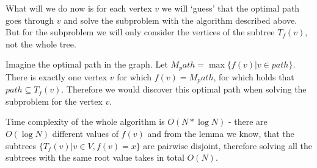 What will we do now is for each vertex $v$ we will `guess' that the optimal path
goes through $v$ and solve the subproblem with the algorithm described above.
But for the subproblem we will only consider the vertices of
the subtree $T_f(v)$, not the whole tree.

Imagine the optimal path in the graph. Let $M_path = \max\{f(v) | v \in path\}$.
There is exactly one vertex $v$ for which $f(v) = M_path$,
for which holds that $path \subseteq T_f(v)$. Therefore we would discover this
optimal path when solving the subproblem for the vertex $v$.

Time complexity of the whole algorithm is $O(N * \log N)$ - there are $O(\log N)$ different values of $f(v)$
and from the lemma we know, that the subtrees $\{T_f(v) | v \in V, f(v) = x\}$ are
pairwise disjoint, therefore solving all the subtrees with the same root value takes in total $O(N)$.

